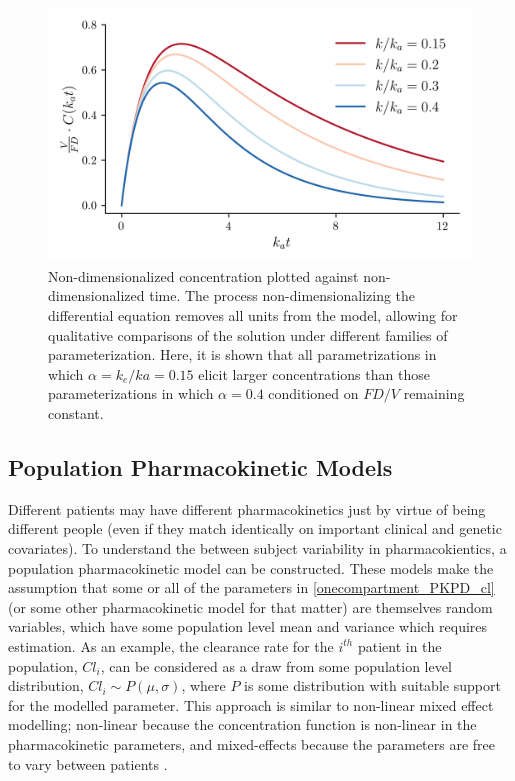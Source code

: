 \begin{figure}[h!]
	\centering
	\includegraphics{figures/pkcurves.png}
	\caption[Non-dimensionalized solutions to pharmacokinetic differential equation] {Non-dimensionalized concentration plotted against non-dimensionalized time.  The process non-dimensionalizing the differential equation removes all units from the model, allowing for qualitative comparisons of the solution under different families of parameterization.  Here, it is shown that all parametrizations in which $\alpha = k_e/ka = 0.15$ elicit larger concentrations than those parameterizations in which $\alpha=0.4$ conditioned on $FD/V$ remaining constant.}
	\label{fig:pkcureves}
\end{figure}

\subsection{Population Pharmacokinetic Models}


Different patients may have different pharmacokinetics just by virtue of being different people (even if they match identically on important clinical and genetic covariates).  To understand the between subject variability in pharmacokientics, a population pharmacokinetic model can be constructed.  These models make the assumption that some or all of the parameters in \cref{onecompartment_PKPD_cl} (or some other pharmacokinetic model for that matter) are themselves random variables, which have some population level mean and variance which requires estimation.  As an example, the clearance rate for the $i^{th}$ patient in the population, $Cl_i$, can be considered as a draw from some population level distribution, $Cl_i \sim P(\mu, \sigma) $, where $P$ is some distribution with suitable support for the modelled parameter.  This approach is similar to non-linear mixed effect modelling; non-linear because the concentration function is non-linear in the pharmacokinetic parameters, and mixed-effects because the parameters are free to vary between patients \cite{mould2013basic}.

